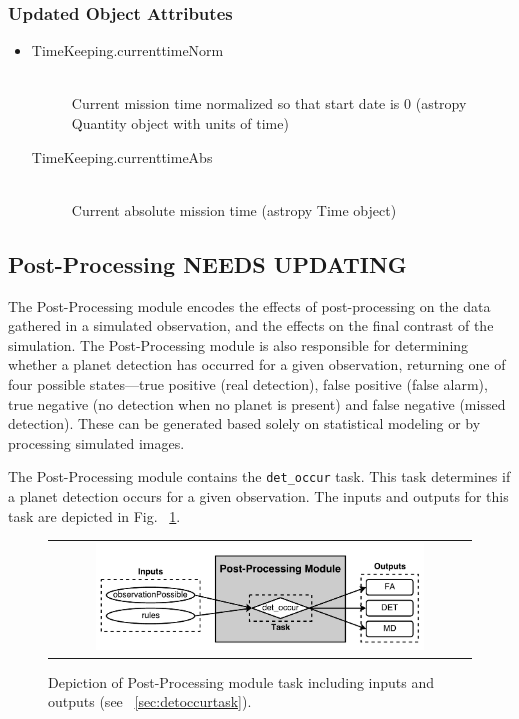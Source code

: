 \documentclass[cleanfoot]{asme2ej}
\begin{document}
\subsubsection*{Updated Object Attributes}
\begin{itemize}
    \item 
    \begin{description}
        \item[TimeKeeping.currenttimeNorm] \hfill \\
        Current mission time normalized so that start date is 0 (astropy Quantity object with units of time)
        \item[TimeKeeping.currenttimeAbs] \hfill \\
        Current absolute mission time (astropy Time object)
    \end{description}
\end{itemize}


\subsection{Post-Processing NEEDS UPDATING}\label{sec:postprocessing}
The Post-Processing module encodes the effects of post-processing on the data gathered in a simulated observation, and the effects on the final contrast of the simulation.  The Post-Processing module is also responsible for determining whether a planet detection has occurred for a given observation, returning one of four possible states---true positive (real detection), false positive (false alarm), true negative (no detection when no planet is present) and false negative (missed detection).  These can be generated based solely on statistical modeling or by processing simulated images.

The Post-Processing module contains the \verb+det_occur+ task.  This task determines if a planet detection occurs for a given observation.  The inputs and outputs for this task are depicted in Fig. ~\ref{fig:postprocessingmodule}.

\begin{figure}[ht]
    \begin{center}
        \begin{tabular}{c}
             \includegraphics[width=0.8\textwidth]{PostTasks}
        \end{tabular}
    \end{center}
    \caption{\label{fig:postprocessingmodule} Depiction of Post-Processing module task including inputs and outputs (see ~\ref{sec:detoccurtask}).}
\end{figure}
\end{document}
